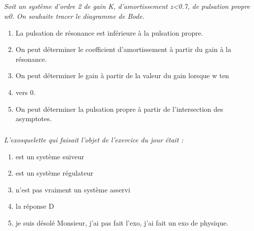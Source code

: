 \documentclass[10pt,fleqn]{article} %
\begin{document}
\begin{multicols}{2}
\subparagraph{}\textit{Soit un système d'ordre 2 de gain K, d'amortissement z<0.7, de pulsation
propre w0. On souhaite tracer le diagramme de Bode.}
\begin{enumerate}
\item La pulsation de résonance est inférieure à la pulsation propre.
\item On peut déterminer le coefficient d'amortissement à partir du gain à la résonance.
\item On peut déterminer le gain à partir de la valeur du gain lorsque w ten\item vers 0.
\item On peut déterminer la pulsation propre à partir de l'intersection des asymptotes.
\end{enumerate}



\subparagraph{}\textit{L'exosquelette qui faisait l'objet de l'exercice du jour était :}
\begin{enumerate}
\item est un système suiveur
\item est un système régulateur
\item n'est pas vraiment un système asservi
\item la réponse D
\item je suis désolé Monsieur, j'ai pas fait l'exo, j'ai fait un exo de physique.
\end{enumerate}

\end{multicols}
\end{document}

